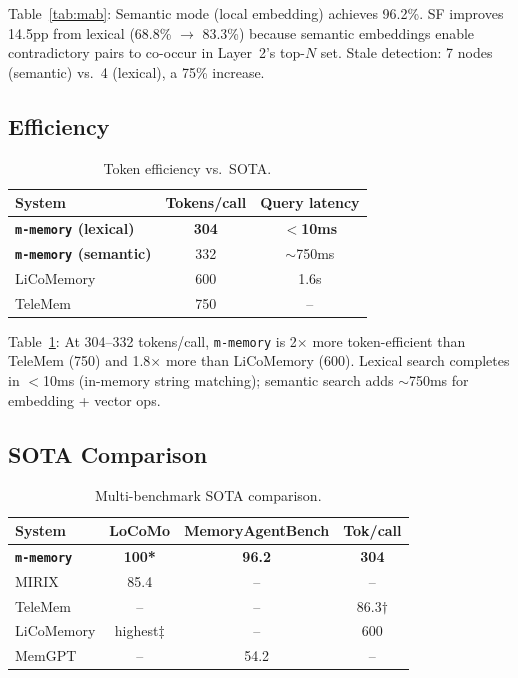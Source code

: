 \documentclass{article}
\theoremstyle{plain}\newtheorem{theorem}{Theorem}[section]
\theoremstyle{definition}\newtheorem{definition}[theorem]{Definition}
\newcommand{\mmemory}{\texttt{m-memory}\xspace}
\newcommand{\MAB}{MemoryAgentBench\xspace}
\begin{document}
Table~\ref{tab:mab}: Semantic mode (local embedding) achieves 96.2\%. SF improves
14.5pp from lexical (68.8\% $\to$ 83.3\%) because semantic embeddings enable
contradictory pairs to co-occur in Layer~2's top-$N$ set. Stale detection: 7 nodes
(semantic) vs.\ 4 (lexical), a 75\% increase.

\subsection{Efficiency}

\begin{table}[t]\centering\caption{Token efficiency vs.\ SOTA.}
\label{tab:efficiency}
\begin{tabular}{@{}lcc@{}}
\toprule
\textbf{System} & \textbf{Tokens/call} & \textbf{Query latency}\\\midrule
\textbf{\mmemory{} (lexical)} & \textbf{304} & \textbf{$<$10ms}\\
\textbf{\mmemory{} (semantic)} & 332 & $\sim$750ms\\
LiCoMemory & 600 & 1.6s\\
TeleMem & 750 & --\\\bottomrule
\end{tabular}
\end{table}

Table~\ref{tab:efficiency}: At 304--332 tokens/call, \mmemory{} is 2$\times$ more
token-efficient than TeleMem (750) and 1.8$\times$ more than LiCoMemory (600).
Lexical search completes in $<$10ms (in-memory string matching); semantic search
adds $\sim$750ms for embedding + vector ops.

\subsection{SOTA Comparison}

\begin{table}[t]\centering\caption{Multi-benchmark SOTA comparison.}
\label{tab:sota}
\begin{tabular}{@{}lccc@{}}
\toprule
\textbf{System} & \textbf{LoCoMo} & \textbf{\MAB{}} & \textbf{Tok/call}\\\midrule
\textbf{\mmemory{}} & \textbf{100*} & \textbf{96.2} & \textbf{304}\\
MIRIX & 85.4 & -- & --\\
TeleMem & -- & -- & 86.3$\dagger$\\
LiCoMemory & highest$\ddagger$ & -- & 600\\
MemGPT & -- & 54.2 & --\\\bottomrule
\end{tabular}
\end{table}
\end{document}
